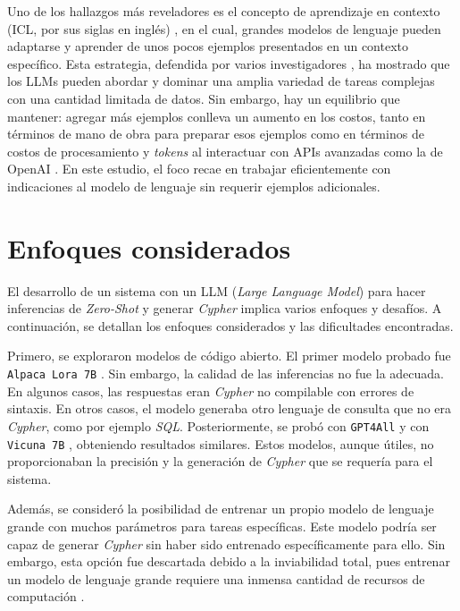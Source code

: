Uno de los hallazgos más reveladores es el concepto de aprendizaje en contexto (ICL, por sus siglas en inglés) \cite{llmsoverview}, en el cual, grandes modelos de lenguaje pueden adaptarse y aprender de unos pocos ejemplos presentados en un contexto específico. Esta estrategia, defendida por varios investigadores \cite{sunetal2023} \cite{pourrezandrafiei2023}, ha mostrado que los LLMs pueden abordar y dominar una amplia variedad de tareas complejas con una cantidad limitada de datos. Sin embargo, hay un equilibrio que mantener: agregar más ejemplos conlleva un aumento en los costos, tanto en términos de mano de obra para preparar esos ejemplos como en términos de costos de procesamiento y \textit{tokens} al interactuar con APIs avanzadas como la de OpenAI \cite{openaiapikey}. En este estudio, el foco recae en trabajar eficientemente con indicaciones al modelo de lenguaje sin requerir ejemplos adicionales.

\section{Enfoques considerados} \label{considered_approaches}

El desarrollo de un sistema con un LLM (\textit{Large Language Model}) para hacer inferencias de \textit{Zero-Shot} y generar \textit{Cypher} implica varios enfoques y desafíos. A continuación, se detallan los enfoques considerados y las dificultades encontradas.

Primero, se exploraron modelos de código abierto. El primer modelo probado fue \texttt{Alpaca Lora 7B} \cite{alpacalora}. Sin embargo, la calidad de las inferencias no fue la adecuada. En algunos casos, las respuestas eran \textit{Cypher} no compilable con errores de sintaxis. En otros casos, el modelo generaba otro lenguaje de consulta que no era \textit{Cypher}, como por ejemplo \textit{SQL}. Posteriormente, se probó con \texttt{GPT4All} \cite{gpt4all} y con \texttt{Vicuna 7B} \cite{vicuna7b}, obteniendo resultados similares. Estos modelos, aunque útiles, no proporcionaban la precisión y la generación de \textit{Cypher} que se requería para el sistema.

Además, se consideró la posibilidad de entrenar un propio modelo de lenguaje grande con muchos parámetros para tareas específicas. Este modelo podría ser capaz de generar \textit{Cypher} sin haber sido entrenado específicamente para ello. Sin embargo, esta opción fue descartada debido a la inviabilidad total, pues entrenar un modelo de lenguaje grande requiere una inmensa cantidad de recursos de computación \cite{llmsoverview}.

